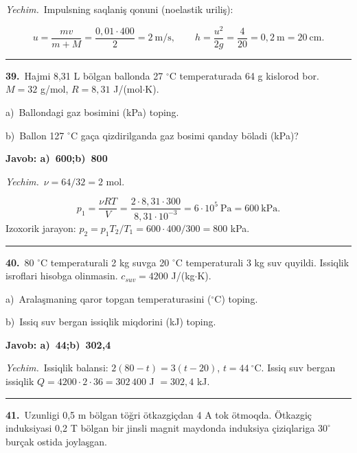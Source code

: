 \documentclass[11pt,a4paper]{article}
\begin{document}
\noindent\textit{Yechim.}\ Impulsning saqlaniş qonuni (noelastik uriliş):\par
\[u=\frac{mv}{m+M}=\frac{0{,}01\cdot400}{2}=2\ \text{m/s},\qquad h=\frac{u^2}{2g}=\frac{4}{20}=0{,}2\ \text{m}=20\ \text{cm}.\]\par\medskip\hrule\medskip
{}\noindent\textbf{39.}\ Hajmi 8,31 L bölgan ballonda 27 $^\circ$C temperaturada 64 g kislorod bor. $M=32$ g/mol, $R=8{,}31$ J/(mol$\cdot$K).\par
\noindent\hspace*{4mm}a)\ Ballondagi gaz bosimini (kPa) toping.\par
\noindent\hspace*{4mm}b)\ Ballon 127 $^\circ$C gaça qizdirilganda gaz bosimi qanday böladi (kPa)?\par
\noindent\colorbox{gray!12}{\parbox{\dimexpr\linewidth-2\fboxsep}{\textbf{Javob: a)\ 600;\quad b)\ 800}}}\par\smallskip
\noindent\textit{Yechim.}\ $\nu=64/32=2$ mol.\par
\[p_1=\frac{\nu RT}{V}=\frac{2\cdot8{,}31\cdot300}{8{,}31\cdot10^{-3}}=6\cdot10^5\ \text{Pa}=600\ \text{kPa}.\]
Izoxorik jarayon: $p_2=p_1T_2/T_1=600\cdot400/300=800$ kPa.\par\par\medskip\hrule\medskip
{}\noindent\textbf{40.}\ 80 $^\circ$C temperaturali 2 kg suvga 20 $^\circ$C temperaturali 3 kg suv quyildi. Issiqlik isroflari hisobga olinmasin. $c_{suv}=4200$ J/(kg$\cdot$K).\par
\noindent\hspace*{4mm}a)\ Aralaşmaning qaror topgan temperaturasini ($^\circ$C) toping.\par
\noindent\hspace*{4mm}b)\ Issiq suv bergan issiqlik miqdorini (kJ) toping.\par
\noindent\colorbox{gray!12}{\parbox{\dimexpr\linewidth-2\fboxsep}{\textbf{Javob: a)\ 44;\quad b)\ 302,4}}}\par\smallskip
\noindent\textit{Yechim.}\ Issiqlik balansi: $2(80-t)=3(t-20)$, $t=44\ ^\circ$C. Issiq suv bergan issiqlik $Q=4200\cdot2\cdot36=302\,400$ J $=302{,}4$ kJ.\par\par\medskip\hrule\medskip
{}\noindent\textbf{41.}\ Uzunligi 0,5 m bölgan töğri ötkazgiçdan 4 A tok ötmoqda. Ötkazgiç induksiyasi 0,2 T bölgan bir jinsli magnit maydonda induksiya çiziqlariga $30^\circ$ burçak ostida joylaşgan.\par
\end{document}
